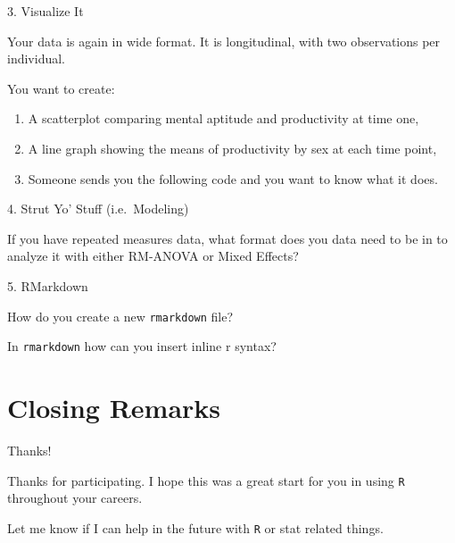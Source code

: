 \begin{frame}[fragile]{3. Visualize It}

Your data is again in wide format. It is longitudinal, with two
observations per individual.

You want to create:

\begin{enumerate}
\def\labelenumi{\arabic{enumi}.}
\tightlist
\item
  A scatterplot comparing mental aptitude and productivity at time one,
\item
  A line graph showing the means of productivity by sex at each time
  point,
\item
  Someone sends you the following code and you want to know what it
  does.
\end{enumerate}

\begin{Shaded}
\begin{Highlighting}[]
\NormalTok{(}\OperatorTok{+}
\StringTok{  }\NormalTok{() }\OperatorTok{+}
\StringTok{  }\NormalTok{(} \NormalTok{(}\NormalTok{, }\NormalTok{)) }\OperatorTok{+}
\StringTok{  }\NormalTok{(} \NormalTok{)}
\end{Highlighting}
\end{Shaded}

\end{frame}

\begin{frame}{4. Strut Yo' Stuff (i.e.~Modeling)}

If you have repeated measures data, what format does you data need to be
in to analyze it with either RM-ANOVA or Mixed Effects?

\end{frame}

\begin{frame}[fragile]{5. RMarkdown}

How do you create a new \texttt{rmarkdown} file?

In \texttt{rmarkdown} how can you insert inline r syntax?

\end{frame}

\section{Closing Remarks}\label{closing-remarks}

\begin{frame}[fragile]{Thanks!}

Thanks for participating. I hope this was a great start for you in using
\texttt{R} throughout your careers.

Let me know if I can help in the future with \texttt{R} or stat related
things.

\end{frame}
